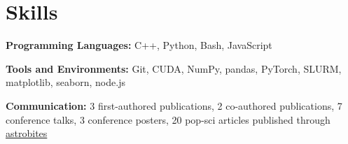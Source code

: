 \documentclass[letterpaper,11pt]{article}
\newcommand{\resumeSubHeadingListStart}{\begin{itemize}[leftmargin=0.15in, label={}]}
\newcommand{\resumeSubHeadingListEnd}{\end{itemize}}
\begin{document}

\section{Skills}
  \vspace{2pt}
  \resumeSubHeadingListStart
    \small{\item{
        \textbf{Programming Languages: }{C++, Python, Bash, JavaScript}  \\ \vspace{3pt}
        
        \textbf{Tools and Environments: }{Git, CUDA, NumPy, pandas, PyTorch, SLURM, matplotlib, seaborn, node.js}  \\ \vspace{3pt}
        
        \textbf{Communication:}{ 3 first-authored publications, 2 co-authored publications, 7 conference talks, 3 conference posters, 20 pop-sci articles published through \href{https://astrobites.org/}{astrobites}} \\ \vspace{3pt}
    }}
  \resumeSubHeadingListEnd
  
\end{document}
